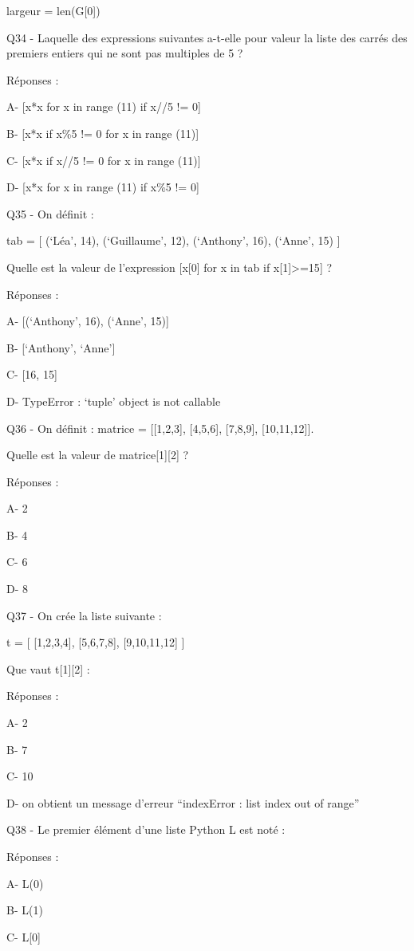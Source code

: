 \documentclass[
]{book}
\begin{document}
largeur = len(G{[}0{]})

Q34 - Laquelle des expressions suivantes a-t-elle pour valeur la liste des carrés des premiers entiers qui ne sont pas multiples de 5 ?

Réponses :

A- {[}x*x for x in range (11) if x//5 != 0{]}

B- {[}x*x if x\%5 != 0 for x in range (11){]}

C- {[}x*x if x//5 != 0 for x in range (11){]}

D- {[}x*x for x in range (11) if x\%5 != 0{]}

Q35 - On définit :

tab = {[} (`Léa', 14), (`Guillaume', 12), (`Anthony', 16), (`Anne', 15) {]}

Quelle est la valeur de l'expression {[}x{[}0{]} for x in tab if x{[}1{]}\textgreater=15{]} ?

Réponses :

A- {[}(`Anthony', 16), (`Anne', 15){]}

B- {[}`Anthony', `Anne'{]}

C- {[}16, 15{]}

D- TypeError : `tuple' object is not callable

Q36 - On définit : matrice = {[}{[}1,2,3{]}, {[}4,5,6{]}, {[}7,8,9{]}, {[}10,11,12{]}{]}.

Quelle est la valeur de matrice{[}1{]}{[}2{]} ?

Réponses :

A- 2

B- 4

C- 6

D- 8

Q37 - On crée la liste suivante :

t = {[} {[}1,2,3,4{]}, {[}5,6,7,8{]}, {[}9,10,11,12{]} {]}

Que vaut t{[}1{]}{[}2{]} :

Réponses :

A- 2

B- 7

C- 10

D- on obtient un message d'erreur ``indexError : list index out of range''

Q38 - Le premier élément d'une liste Python L est noté :

Réponses :

A- L(0)

B- L(1)

C- L{[}0{]}
\end{document}

